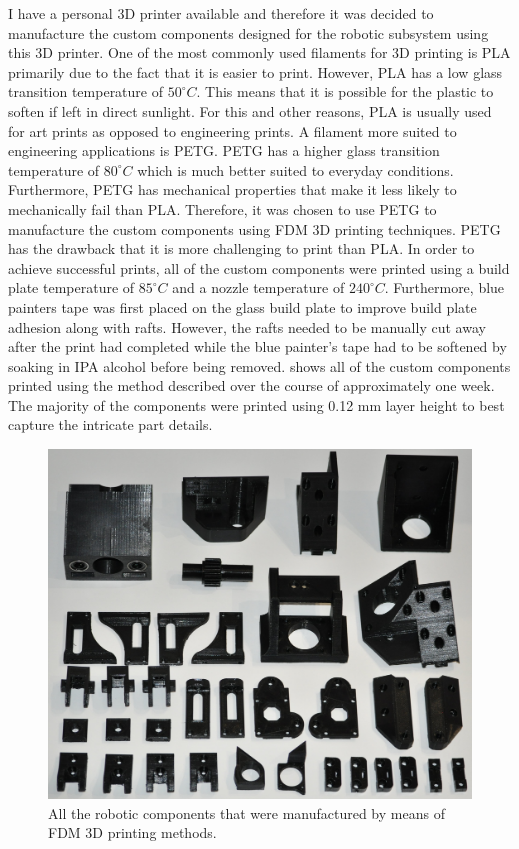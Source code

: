 I have a personal 3D printer available and therefore it was decided to manufacture the custom components designed for the robotic subsystem using this 3D printer. One of the most commonly used filaments for 3D printing is \ac{PLA} primarily due to the fact that it is easier to print. However, \ac{PLA} has a low glass transition temperature of $50^{\circ}C$. This means that it is possible for the plastic to soften if left in direct sunlight. For this and other reasons, PLA is usually used for art prints as opposed to engineering prints. A filament more suited to engineering applications is \ac{PETG}. \ac{PETG} has a higher glass transition temperature of $80^{\circ}C$ which is much better suited to everyday conditions. Furthermore, \ac{PETG} has mechanical properties that make it less likely to mechanically fail than \ac{PLA}. Therefore, it was chosen to use \ac{PETG} to manufacture the custom components using \ac{FDM} 3D printing techniques. \ac{PETG} has the drawback that it is more challenging to print than \ac{PLA}. In order to achieve successful prints, all of the custom components were printed using a build plate temperature of $85^{\circ}C$ and a nozzle temperature of $240^{\circ}C$. Furthermore, blue painters tape was first placed on the glass build plate to improve build plate adhesion along with rafts. However, the rafts needed to be manually cut away after the print had completed while the blue painter's tape had to be softened by soaking in IPA alcohol before being removed.  shows all of the custom components printed using the method described over the course of approximately one week. The majority of the components were printed using 0.12 mm layer height to best capture the intricate part details.

\begin{figure}[H]
	\centering
	\includegraphics[width=0.7\linewidth]{figures/202108/3d-printed-components.JPG}
	\caption{All the robotic components that were manufactured by means of \ac{FDM} 3D printing methods.}
	\label{fig:3d-printed-components}
\end{figure}

